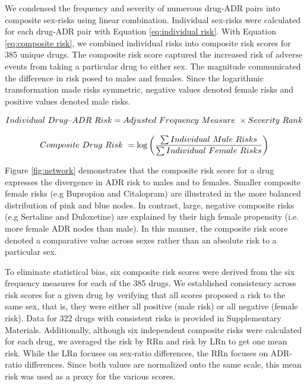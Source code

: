 \documentclass[11pt, oneside]{article}
\begin{document}
We condensed the frequency and severity of numerous drug-ADR pairs into composite sex-risks using linear combination. Individual sex-risks were calculated for each drug-ADR pair with Equation \ref{eq:individual risk}. With Equation \ref{eq:composite risk}, we combined individual risks into composite risk scores for 385 unique drugs. The composite risk score captured the increased risk of adverse events from taking a particular drug to either sex. The magnitude communicated the difference in risk posed to males and females. Since the logarithmic transformation made risks symmetric, negative values denoted female risks and positive values denoted male risks.

\begin{equation} \label{eq:individual risk}
	Individual\ Drug\textnormal{–}ADR\ Risk = Adjusted\ Frequency\ Measure\ \times Severity\ Rank
\end{equation}

\begin{equation} \label{eq:composite risk}
	Composite\ Drug\ Risk\ = \log \bigg( \frac{\sum Individual\ Male\ Risks}{\sum Individual\ Female\  Risks} \bigg) \\
\end{equation}

Figure \ref{fig:network} demonstrates that the composite risk score for a drug expresses the divergence in ADR risk to males and to females. Smaller composite female risks (e.g Bupropion and Citalopram)  are illustrated in the more balanced distribution of pink and blue nodes. In contrast, large, negative composite risks (e.g Sertaline and Duloxetine) are explained by their high female propensity (i.e. more female ADR nodes than male). In this manner, the composite risk score denoted a comparative value across sexes rather than an absolute risk to a particular sex. 

To eliminate statistical bias, six composite risk scores were derived from the six frequency measures for each of the 385 drugs. We established consistency across risk scores for a given drug by verifying that all scores proposed a risk to the same sex, that is, they were either all positive (male risk) or all negative (female risk). Data for 322 drugs with consistent risks is provided in Supplementary Materials. Additionally, although six independent composite risks were calculated for each drug, we averaged the risk by RRn and risk by LRn to get one mean risk. While the LRn focuses on sex-ratio differences, the RRn focuses on ADR-ratio differences. Since both values are normalized onto the same scale, this mean risk was used as a proxy for the various scores. 
\end{document}
